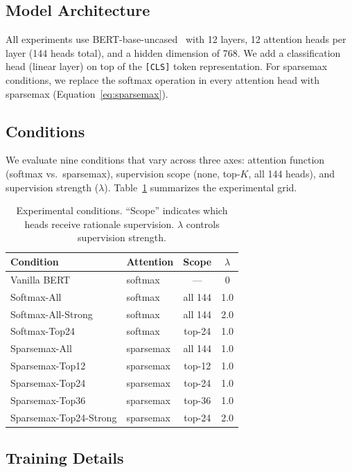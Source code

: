 \documentclass{article}
\begin{document}
\subsection{Model Architecture}

All experiments use BERT-base-uncased~\citep{devlin2019bert} with 12 layers,
12 attention heads per layer (144 heads total), and a hidden dimension of
768. We add a classification head (linear layer) on top of the \texttt{[CLS]}
token representation. For sparsemax conditions, we replace the softmax
operation in every attention head with sparsemax (Equation~\ref{eq:sparsemax}).

\subsection{Conditions}

We evaluate nine conditions that vary across three axes: attention function
(softmax vs.\ sparsemax), supervision scope (none, top-$K$, all 144 heads),
and supervision strength ($\lambda$). Table~\ref{tab:conditions} summarizes
the experimental grid.

\begin{table}[t]
\centering
\caption{Experimental conditions. ``Scope'' indicates which heads receive
rationale supervision. $\lambda$ controls supervision strength.}
\label{tab:conditions}
\small
\begin{tabular}{@{}llcc@{}}
\toprule
Condition & Attention & Scope & $\lambda$ \\
\midrule
Vanilla BERT & softmax & --- & 0 \\
Softmax-All & softmax & all 144 & 1.0 \\
Softmax-All-Strong & softmax & all 144 & 2.0 \\
Softmax-Top24 & softmax & top-24 & 1.0 \\
Sparsemax-All & sparsemax & all 144 & 1.0 \\
Sparsemax-Top12 & sparsemax & top-12 & 1.0 \\
Sparsemax-Top24 & sparsemax & top-24 & 1.0 \\
Sparsemax-Top36 & sparsemax & top-36 & 1.0 \\
Sparsemax-Top24-Strong & sparsemax & top-24 & 2.0 \\
\bottomrule
\end{tabular}
\end{table}

\subsection{Training Details}
\end{document}
